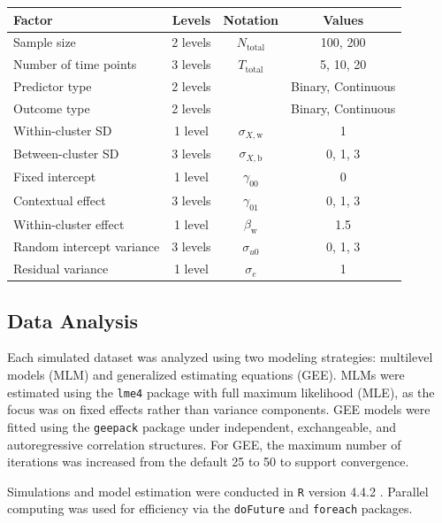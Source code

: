 \documentclass[stu]{apa7}
\begin{document}
\begin{center}
    \label{tab:simstudysetup}
    
    \begin{longtable}{lccc}
    \toprule
    Factor & Levels & Notation & Values \\
    \midrule
    Sample size & 2 levels & \(N_{\text{total}}\) & 100, 200 \\
    Number of time points & 3 levels & \(T_{\text{total}}\) & 5, 10, 20 \\
    Predictor type & 2 levels &  & Binary, Continuous \\
    Outcome type & 2 levels &  & Binary, Continuous \\
    Within-cluster SD & 1 level & \(\sigma_{X,\text{w}}\) & 1 \\
    Between-cluster SD & 3 levels & \(\sigma_{X,\text{b}}\) & 0, 1, 3 \\
    Fixed intercept & 1 level & \(\gamma_{00}\) & 0 \\
    Contextual effect & 3 levels & \(\gamma_{01}\) & 0, 1, 3 \\
    Within-cluster effect & 1 level & \(\beta_{\text{w}}\) & 1.5 \\
    Random intercept variance & 3 levels & \(\sigma_{u0}\) & 0, 1, 3 \\
    Residual variance & 1 level & \(\sigma_e\) & 1 \\
    \bottomrule
    \end{longtable}
\end{center}

\subsection{Data Analysis}

Each simulated dataset was analyzed using two modeling strategies: multilevel models (MLM) and generalized estimating equations (GEE). MLMs were estimated using the \texttt{lme4} package \parencite{bates_fitting_2015} with full maximum likelihood (MLE), as the focus was on fixed effects rather than variance components. GEE models were fitted using the \texttt{geepack} package \parencite{halekoh_r_2006} under independent, exchangeable, and autoregressive correlation structures. For GEE, the maximum number of iterations was increased from the default 25 to 50 to support convergence.

Simulations and model estimation were conducted in \texttt{R} version 4.4.2 \parencite{r_core_team_r_2024}. Parallel computing was used for efficiency via the \texttt{doFuture} \parencite{RJ-2021-048} and \texttt{foreach} \parencite{daniel_foreach_2022} packages.
\end{document}
